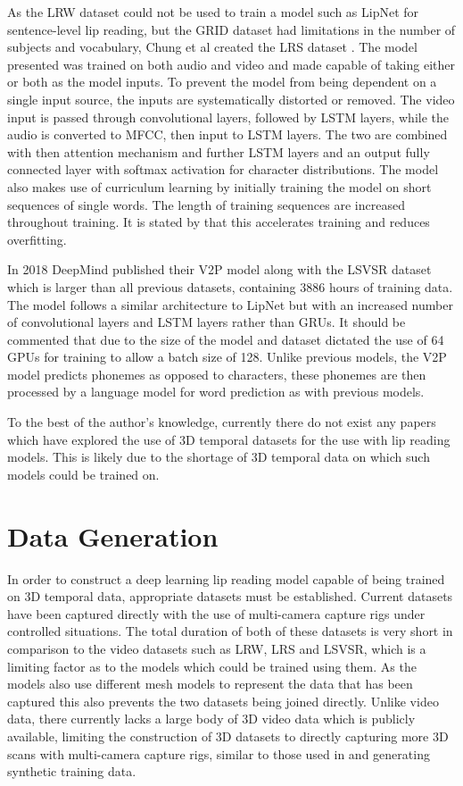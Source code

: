 \documentclass[12pt]{article}
\begin{document}
As the LRW dataset could not be used to train a model such as LipNet for sentence-level lip reading, but the GRID dataset had limitations in the number of subjects and vocabulary, Chung et al created the LRS dataset \cite{Chung2017}.
The model presented was trained on both audio and video and made capable of taking either or both as the model inputs.
To prevent the model from being dependent on a single input source, the inputs are systematically distorted or removed.
The video input is passed through convolutional layers, followed by LSTM layers, while the audio is converted to MFCC, then input to LSTM layers.
The two are combined with then attention mechanism and further LSTM layers and an output fully connected layer with softmax activation for character distributions.
The model also makes use of curriculum learning by initially training the model on short sequences of single words.
The length of training sequences are increased throughout training.
It is stated by \cite{Chung2017} that this accelerates training and reduces overfitting.

In 2018 DeepMind published their V2P model \cite{Shillingford2018} along with the LSVSR dataset which is larger than all previous datasets, containing 3886 hours of training data.
The model follows a similar architecture to LipNet \cite{Assael2016} but with an increased number of convolutional layers and LSTM layers rather than GRUs.
It should be commented that due to the size of the model and dataset dictated the use of 64 GPUs for training to allow a batch size of 128.
Unlike previous models, the V2P model predicts phonemes as opposed to characters, these phonemes are then processed by a language model for word prediction as with previous models.

To the best of the author's knowledge, currently there do not exist any papers which have explored the use of 3D temporal datasets for the use with lip reading models. 
This is likely due to the shortage of 3D temporal data on which such models could be trained on.

\section{Data Generation}
In order to construct a deep learning lip reading model capable of being trained on 3D temporal data, appropriate datasets must be established.
Current datasets have been captured directly \cite{Tzirakis2019, Cudeiro2019} with the use of multi-camera capture rigs under controlled situations.
The total duration of both of these datasets is very short in comparison to the video datasets such as LRW, LRS and LSVSR, which is a limiting factor as to the models which could be trained using them.
As the models also use different mesh models to represent the data that has been captured this also prevents the two datasets being joined directly.
Unlike video data, there currently lacks a large body of 3D video data which is publicly available, limiting the construction of 3D datasets to directly capturing more 3D scans with multi-camera capture rigs, similar to those used in \cite{Tzirakis2019, Cudeiro2019} and generating synthetic training data.
\end{document}
